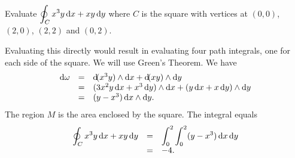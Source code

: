 \section*{}
\begin{problem}
Evaluate $\doint _C x^3y\d{x}+ xy\d{y}$ where  $C$ is the square with
vertices at $(0, 0)$, $(2, 0)$, $(2, 2)$ and $(0, 2)$.
\begin{answer}Evaluating this directly would result in evaluating four path
integrals, one for each side of the square. We will use Green's
Theorem. We have
$$\begin{array}{lll}\d{\omega} &  = &  \d (x^3y) \wedge \d{x}+ \d (xy) \wedge \d{y}\\
& = & (3x^2y\d{x}+ x^3\d{y}) \wedge \d{x}+ (y\d{x}+
x\d{y} ) \wedge \d{y} \\
& = & (y - x^3)\d{x}\wedge \d{y}.
\end{array}$$
The region $M$ is the area enclosed by the square. The integral
equals
$$\begin{array}{lll}
\doint _C x^3y\d{x}+ xy\d{y} & = & \dint _0 ^2 \dint _0 ^2 (y
- x^3)\d{x} \d{y} \\
& = & -4.
\end{array}$$
\end{answer}
\end{problem}
